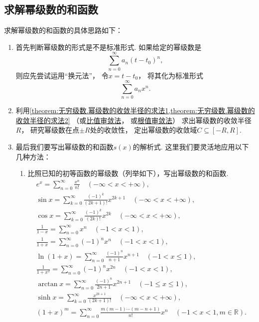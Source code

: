 \subsection*{求解幂级数的和函数}
求解幂级数的和函数的具体思路如下：
\begin{enumerate}
	\item 首先判断幂级数的形式是不是标准形式.
	如果给定的幂级数是\[
		\sum_{n=0}^\infty a_n (t-t_0)^n,
	\]
	则应先尝试运用“换元法”，
	令\(x=t-t_0\)，
	将其化为标准形式\[
		\sum_{n=0}^\infty a_n x^n.
	\]

	\item 利用\cref{theorem:无穷级数.幂级数的收敛半径的求法1,theorem:无穷级数.幂级数的收敛半径的求法2}%
	（或\hyperref[theorem:无穷级数.正项级数的比值审敛法]{比值审敛法}，
	或\hyperref[theorem:无穷级数.正项级数的根值审敛法]{根值审敛法}）%
	求出幂级数的收敛半径\(R\)，
	研究幂级数在点\(\pm R\)处的收敛性，
	定出幂级数的收敛域\(C\subseteq[-R,R]\).

	\item 最后我们要写出幂级数的和函数\(s(x)\)的解析式.
	这里我们要灵活地应用以下几种方法：\begin{enumerate}
		\item 比照已知的初等函数的幂级数（列举如下），写出幂级数的和函数.
		\begin{gather*}
			e^x = \sum_{n=0}^\infty \frac{x^n}{n!}
				\quad(-\infty<x<+\infty), \\
			\sin x = \sum_{k=0}^\infty \frac{(-1)^k}{(2k+1)!} x^{2k+1}
				\quad(-\infty<x<+\infty), \\
			\cos x = \sum_{k=0}^\infty \frac{(-1)^k}{(2k)!} x^{2k}
				\quad(-\infty<x<+\infty), \\
			\frac{1}{1-x} = \sum_{n=0}^\infty x^n
				\quad(-1<x<1), \\
			\frac{1}{1+x} = \sum_{n=0}^\infty (-1)^n x^n
				\quad(-1<x<1), \\
			\ln(1+x) = \sum_{n=0}^\infty \frac{(-1)^n}{n+1} x^{n+1}
				\quad(-1<x\leq1), \\
			\frac{1}{1+x^2} = \sum_{n=0}^\infty (-1)^n x^{2n}
				\quad(-1<x<1), \\
			\arctan x = \sum_{n=0}^\infty \frac{(-1)^n}{2n+1} x^{2n+1}
				\quad(-1 \leq x \leq 1), \\
			\sinh x = \sum_{k=0}^\infty \frac{x^{2k+1}}{(2k+1)!}
				\quad(-\infty<x<+\infty), \\
			(1+x)^m = \sum_{n=0}^\infty \frac{m(m-1)\dotsm(m-n+1)}{n!} x^n
				\quad(-1<x<1,m\in\mathbb{R}).
		\end{gather*}


\end{enumerate}
\end{enumerate}
